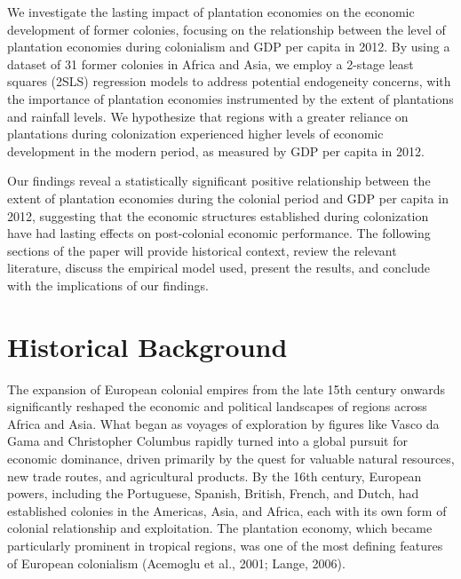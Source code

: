 \documentclass[12pt]{article}
\begin{document}
\vspace{0.2in}
\noindent We investigate the lasting impact of plantation economies on the economic development of former colonies, focusing on the relationship between the level of plantation economies during colonialism and GDP per capita in 2012. By using a dataset of 31 former colonies in Africa and Asia, we employ a 2-stage least squares (2SLS) regression models to address potential endogeneity concerns, with the importance of plantation economies instrumented by the extent of plantations and rainfall levels. We hypothesize that regions with a greater reliance on plantations during colonization experienced higher levels of economic development in the modern period, as measured by GDP per capita in 2012.

\noindent Our findings reveal a statistically significant positive relationship between the extent of plantation economies during the colonial period and GDP per capita in 2012, suggesting that the economic structures established during colonization have had lasting effects on post-colonial economic performance. 
The following sections of the paper will provide historical context, review the relevant literature, discuss the empirical model used, present the results, and conclude with the implications of our findings.

\vspace{1 in}
\section{Historical Background}
\vspace{0.2in}
The expansion of European colonial empires from the late 15th century onwards significantly reshaped the economic and political landscapes of regions across Africa and Asia. What began as voyages of exploration by figures like Vasco da Gama and Christopher Columbus rapidly turned into a global pursuit for economic dominance, driven primarily by the quest for valuable natural resources, new trade routes, and agricultural products. By the 16th century, European powers, including the Portuguese, Spanish, British, French, and Dutch, had established colonies in the Americas, Asia, and Africa, each with its own form of colonial relationship and exploitation. The plantation economy, which became particularly prominent in tropical regions, was one of the most defining features of European colonialism (Acemoglu et al., 2001; Lange, 2006).
\end{document}
